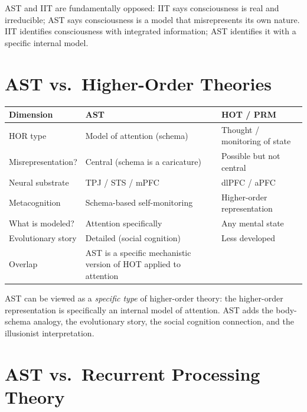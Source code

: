 \documentclass[11pt,a4paper]{report}
\begin{document}
AST and IIT are fundamentally opposed: IIT says consciousness is real and irreducible; AST says consciousness is a model that misrepresents its own nature. IIT identifies consciousness with integrated information; AST identifies it with a specific internal model.

\section{AST vs.\ Higher-Order Theories}

\begin{compbox}
\renewcommand{\arraystretch}{1.4}
\begin{tabular}{>{\raggedright}p{3cm} >{\raggedright}p{5.2cm} >{\raggedright\arraybackslash}p{4.8cm}}
  \toprule
  \textbf{Dimension} & \textbf{AST} & \textbf{HOT / PRM} \\
  \midrule
  HOR type & Model of attention (schema) & Thought / monitoring of state \\
  Misrepresentation? & Central (schema is a caricature) & Possible but not central \\
  Neural substrate & TPJ / STS / mPFC & dlPFC / aPFC \\
  Metacognition & Schema-based self-monitoring & Higher-order representation \\
  What is modeled? & Attention specifically & Any mental state \\
  Evolutionary story & Detailed (social cognition) & Less developed \\
  Overlap & AST is a specific mechanistic version of HOT applied to attention \\
  \bottomrule
\end{tabular}
\end{compbox}

AST can be viewed as a \emph{specific type} of higher-order theory: the higher-order representation is specifically an internal model of attention. AST adds the body-schema analogy, the evolutionary story, the social cognition connection, and the illusionist interpretation.

\section{AST vs.\ Recurrent Processing Theory}
\end{document}
